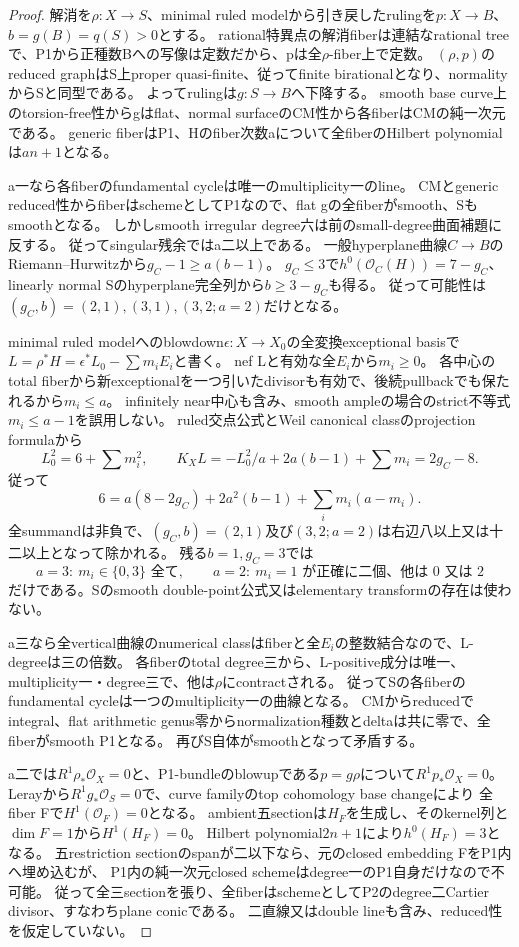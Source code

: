 \documentclass[a4paper,11pt]{ltjsarticle}
\theoremstyle{definition}
\begin{document}
\begin{proof}
解消を$\rho:X\to S$、minimal ruled modelから引き戻したrulingを$p:X\to B$、$b=g(B)=q(S)>0$とする。
rational特異点の解消fiberは連結なrational treeで、P1から正種数Bへの写像は定数だから、pは全$\rho$-fiber上で定数。
$(\rho,p)$のreduced graphはS上proper quasi-finite、従ってfinite birationalとなり、normalityからSと同型である。
よってrulingは$g:S\to B$へ下降する。
smooth base curve上のtorsion-free性からgはflat、normal surfaceのCM性から各fiberはCMの純一次元である。
generic fiberはP1、Hのfiber次数aについて全fiberのHilbert polynomialは$an+1$となる。

a一なら各fiberのfundamental cycleは唯一のmultiplicity一のline。
CMとgeneric reduced性からfiberはschemeとしてP1なので、flat gの全fiberがsmooth、Sもsmoothとなる。
しかしsmooth irregular degree六は前のsmall-degree曲面補題に反する。
従ってsingular残余ではa二以上である。
一般hyperplane曲線$C\to B$のRiemann--Hurwitzから$g_C-1\ge a(b-1)$。
$g_C\le3$で$h^0(\mathcal O_C(H))=7-g_C$、linearly normal Sのhyperplane完全列から$b\ge3-g_C$も得る。
従って可能性は$(g_C,b)=(2,1),(3,1),(3,2;a=2)$だけとなる。

minimal ruled modelへのblowdown$\epsilon:X\to X_0$の全変換exceptional basisで
$L=\rho^*H=\epsilon^*L_0-\sum m_iE_i$と書く。
nef Lと有効な全$E_i$から$m_i\ge0$。
各中心のtotal fiberから新exceptionalを一つ引いたdivisorも有効で、後続pullbackでも保たれるから$m_i\le a$。
infinitely near中心も含み、smooth ampleの場合のstrict不等式$m_i\le a-1$を誤用しない。
ruled交点公式とWeil canonical classのprojection formulaから
\[
 L_0^2=6+\sum m_i^2,\qquad
 K_XL=-L_0^2/a+2a(b-1)+\sum m_i=2g_C-8.
\]
従って
\[
 6=a(8-2g_C)+2a^2(b-1)+\sum_i m_i(a-m_i).
\]
全summandは非負で、$(g_C,b)=(2,1)$及び$(3,2;a=2)$は右辺八以上又は十二以上となって除かれる。
残る$b=1,g_C=3$では
\[
 a=3:\ m_i\in\{0,3\}\text{ 全て},\qquad
 a=2:\ m_i=1\text{ が正確に二個、他は }0\text{ 又は }2
\]
だけである。Sのsmooth double-point公式又はelementary transformの存在は使わない。

a三なら全vertical曲線のnumerical classはfiberと全$E_i$の整数結合なので、L-degreeは三の倍数。
各fiberのtotal degree三から、L-positive成分は唯一、multiplicity一・degree三で、他は$\rho$にcontractされる。
従ってSの各fiberのfundamental cycleは一つのmultiplicity一の曲線となる。
CMからreducedでintegral、flat arithmetic genus零からnormalization種数とdeltaは共に零で、全fiberがsmooth P1となる。
再びS自体がsmoothとなって矛盾する。

a二では$R^1\rho_*\mathcal O_X=0$と、P1-bundleのblowupである$p=g\rho$について$R^1p_*\mathcal O_X=0$。
Lerayから$R^1g_*\mathcal O_S=0$で、curve familyのtop cohomology base changeにより
全fiber Fで$H^1(\mathcal O_F)=0$となる。
ambient五sectionは$H_F$を生成し、そのkernel列と$\dim F=1$から$H^1(H_F)=0$。
Hilbert polynomial$2n+1$により$h^0(H_F)=3$となる。
五restriction sectionのspanが二以下なら、元のclosed embedding FをP1内へ埋め込むが、
P1内の純一次元closed schemeはdegree一のP1自身だけなので不可能。
従って全三sectionを張り、全fiberはschemeとしてP2のdegree二Cartier divisor、すなわちplane conicである。
二直線又はdouble lineも含み、reduced性を仮定していない。


\end{proof}
\end{document}
